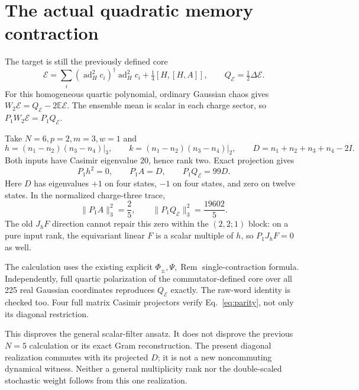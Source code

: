 \documentclass[11pt,a4paper]{article}
\newcommand{\EE}{\mathbb E}
\newcommand{\core}{\mathcal E}
\DeclareMathOperator{\Rem}{Rem}
\begin{document}
\newpage
\section{The actual quadratic memory contraction}
The target is still the previously defined core
\begin{equation}
 \core=\sum_i(\operatorname{ad}_H^2c_i)^\dagger
                   \operatorname{ad}_H^2c_i
                  +\tfrac14[H,[H,A]],\qquad
 Q_{\core}=\tfrac12\Delta\core.
\end{equation}
For this homogeneous quartic polynomial, ordinary Gaussian chaos
gives $W_2\core=Q_{\core}-2\EE\core$. The ensemble mean is scalar in
each charge sector, so $P_1W_2\core=P_1Q_{\core}$.

Take $N=6,p=2,m=3,w=1$ and
\begin{equation}
 h=(n_1-n_2)(n_3-n_4)\big|_3,\qquad
 k=(n_1-n_2)(n_3-n_4)\big|_2,\qquad
 D=n_1+n_2+n_3+n_4-2I.
\end{equation}
Both inputs have Casimir eigenvalue $20$, hence rank two. Exact
projection gives
\begin{equation}
 \boxed{P_1h^2=0,\qquad P_1A=D,\qquad P_1Q_{\core}=99D.}
 \label{eq:witness}
\end{equation}
Here $D$ has eigenvalues $+1$ on four states, $-1$ on four states,
and zero on twelve states. In the normalized charge-three trace,
\begin{equation}
 \|P_1A\|_3^2=\frac25,\qquad
 \|P_1Q_{\core}\|_3^2=\frac{19602}{5}.
\end{equation}
The old $J_hF$ direction cannot repair this zero within the $(2,2;1)$
block: on a pure input rank, the equivariant linear $F$ is a scalar
multiple of $h$, so $P_1J_hF=0$ as well.

The calculation uses the existing explicit $\Phi_\pm,\Psi,\Rem$
single-contraction formula. Independently, full quartic polarization
of the commutator-defined core over all 225 real Gaussian coordinates
reproduces $Q_{\core}$ exactly. The raw-word identity is checked too.
Four full matrix Casimir projectors verify
Eq.~\eqref{eq:parity}, not only its diagonal restriction.

This disproves the general scalar-filter ansatz. It does not disprove
the previous $N=5$ calculation or its exact Gram reconstruction.
The present diagonal realization commutes with its projected $D$;
it is not a new noncommuting dynamical witness. Neither a general
multiplicity rank nor the double-scaled stochastic weight follows
from this one realization.
\end{document}
